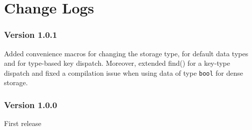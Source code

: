 
\chapter*{Change Logs} 

\subsection*{Version 1.0.1} Added convenience macros for changing the storage type, for default data types and for type-based key dispatch. Moreover, extended find() for a key-type dispatch and fixed a compilation issue when using data of type \lstinline|bool| for dense storage.

\subsection*{Version 1.0.0}
First release
